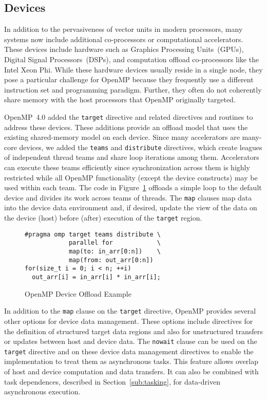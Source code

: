 \subsection{Devices}
\label{sub:devices}

In addition to the pervasiveness of vector units in modern processors, many
systems now include additional co-processors or computational accelerators.  
These devices include hardware such as Graphics Processing Units~(GPUs), 
Digital Signal Processors~(DSPs), and computation offload co-processors 
like the Intel Xeon Phi. While these hardware devices usually reside in 
a single node, they pose a particular challenge for OpenMP because they 
frequently use a different instruction set and programming paradigm. Further,
they often do not coherently share memory with the host processors that
OpenMP originally targeted.

OpenMP~4.0 added the \texttt{target} directive and related directives and 
routines to address these devices. These additions provide an offload model
that uses the existing shared-memory model on each device. Since many 
accelerators are many-core devices, we added the \texttt{teams} and 
\texttt{distribute} directives, which create leagues of independent thread 
teams and share loop iterations among them. Accelerators can execute these 
teams efficiently since synchronization across them is highly restricted while
all OpenMP functionality (except the device constructs) may be used within 
each team. The code in Figure~\ref{fig:target-loop} offloads a simple loop 
to the default device and divides its work across teams of threads. The 
\texttt{map} clauses map data into the device data environment and, if 
desired, update the view of the data on the device (host) before (after)
execution of the \texttt{target} region.

\begin{figure}
\begin{verbatim}
#pragma omp target teams distribute \
            parallel for            \
            map(to: in_arr[0:n])    \
            map(from: out_arr[0:n])
for(size_t i = 0; i < n; ++i)
  out_arr[i] = in_arr[i] * in_arr[i];
\end{verbatim}
\caption{OpenMP Device Offload Example\label{fig:target-loop}}
\end{figure}

In addition to the \texttt{map} clause on the \texttt{target} directive, 
OpenMP provides several other options for device data management. These 
options include directives for the definition of structured target data 
regions and also for unstructured transfers or updates between host and 
device data. The \texttt{nowait} clause can be used on the \texttt{target}
directive and on these device data management directives to enable the 
implementation to treat them as asynchronous tasks. This feature allows 
overlap of host and device computation and data transfers. It can also be 
combined with task dependences, described in Section~\ref{sub:tasking}, for 
data-driven asynchronous execution. 

